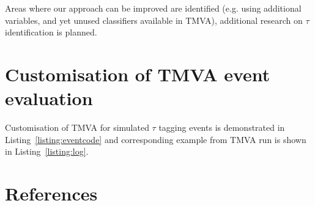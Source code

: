 \documentclass[a4paper]{jpconf}
\begin{document}
Areas where our approach can be improved are identified
(e.g. using additional variables, and yet unused classifiers available in TMVA), 
additional research on $\tau$ identification is planned.




\appendix %
\section{Customisation of TMVA event evaluation}

Customisation of TMVA for simulated $\tau$ tagging events is demonstrated in 
Listing~\ref{listing:eventcode} and corresponding example from TMVA run is
shown in Listing~\ref{listing:log}.


\lstset{%
language=python,
keywordstyle=\underbar,
caption=Pseudocode for the event evaluation.,
breaklines=true,
stepnumber=99999,  %
showlines=false,
label=listing:eventcode
}


\newpage







\section*{References}
\end{document}
